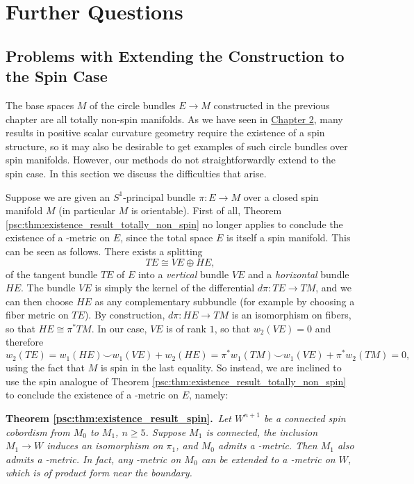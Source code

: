 \chapter{Further Questions}
\label{chapter:further_questions}

\section{Problems with Extending the Construction to the Spin Case}

The base spaces $M$ of the circle bundles $E \to M$ constructed in the previous chapter are all totally non-spin manifolds. As we have seen in \hyperref[chapter:psc]{Chapter 2}, many results in positive scalar curvature geometry require the existence of a spin structure, so it may also be desirable to get examples of such circle bundles over spin manifolds. However, our methods do not straightforwardly extend to the spin case. In this section we discuss the difficulties that arise. 

Suppose we are given an $S^1$-principal bundle $\pi \colon E \to M$ over a closed spin manifold $M$ (in particular $M$ is orientable). First of all, Theorem \ref{psc:thm:existence_result_totally_non_spin} no longer applies to conclude the existence of a \psc-metric on $E$, since the total space $E$ is itself a spin manifold. This can be seen as follows. There exists a splitting 
\[
TE \cong VE \oplus HE,
\]
of the tangent bundle $TE$ of $E$ into a \textit{vertical} bundle $VE$ and a \textit{horizontal} bundle $HE$. The bundle $VE$ is simply the kernel of the differential $d\pi \colon TE \to TM$, and we can then choose $HE$ as any complementary subbundle (for example by choosing a fiber metric on $TE$). By construction, $d \pi \colon HE \to TM$ is an isomorphism on fibers, so that $HE \cong \pi^\ast TM$. In our case, $VE$ is of rank $1$, so that $w_2(VE) = 0$ and therefore
\[
w_2(TE) = w_1(HE) \smile w_1(VE) + w_2(HE) = \pi^\ast w_1(TM) \smile w_1(VE) + \pi^\ast w_2(TM) = 0,
\]
using the fact that $M$ is spin in the last equality.
So instead, we are inclined to use the spin analogue of Theorem \ref{psc:thm:existence_result_totally_non_spin} to conclude the existence of a \psc-metric on $E$, namely:

\vspace{\baselineskip}
\noindent\textbf{Theorem \ref{psc:thm:existence_result_spin}.}\itshape\ 
Let $W^{n+1}$ be a connected spin cobordism from $M_0$ to $M_1$, $n \geq 5$. Suppose $M_1$ is connected, the inclusion $M_1 \to W$ induces an isomorphism on $\pi_1$, and $M_0$ admits a \psc-metric. Then $M_1$ also admits a \psc-metric. In fact, any \psc-metric on $M_0$ can be extended to a \psc-metric on $W$, which is of product form near the boundary. 
\normalfont
\vspace{\baselineskip}


